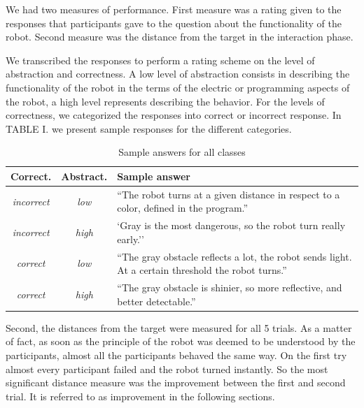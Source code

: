 \documentclass{sig-alternate}
\begin{document}
We had two measures of performance. First measure was a rating given to
the responses that participants gave to the question about the
functionality of the robot. Second measure was the distance from the
target in the interaction phase.

We transcribed the responses to perform a rating scheme on the level of
abstraction and correctness. A low level of abstraction consists in
describing the functionality of the robot in the terms of the electric
or programming aspects of the robot, a high level represents describing
the behavior. For the levels of correctness, we categorized the
responses into correct or incorrect response. In TABLE I. we present
sample responses for the different categories.

\begin{table}[ht!]
    \centering
    \footnotesize
    \begin{tabular}{ccp{4.5cm}}
        \toprule
        Correct. & Abstract. & Sample answer \\
        \midrule
        \textit{incorrect} & \textit{low} & ``The robot turns at a given distance in respect to a color, defined in the program.''\\ 
        \midrule
        \textit{incorrect} & \textit{high} & `Gray is the most dangerous, so the
        robot turn really early.''\\ 
        \midrule
        \textit{correct} & \textit{low} & ``The gray obstacle reflects a lot,
        the robot sends light. At a certain threshold the robot turns.'' \\ 
        \midrule
        \textit{correct} & \textit{high} & ``The gray obstacle is shinier, so
        more reflective, and better detectable.''\\ 
        \bottomrule
    \end{tabular}
    \caption{Sample answers for all classes}

    \label{sample_answer}
\end{table}

Second, the distances from the target were measured for all 5 trials. As
a matter of fact, as soon as the principle of the robot was deemed to be
understood by the participants, almost all the participants behaved the
same way. On the first try almost every participant failed and the robot
turned instantly. So the most significant distance measure was the
improvement between the first and second trial. It is referred to as
improvement in the following sections.
\end{document}
